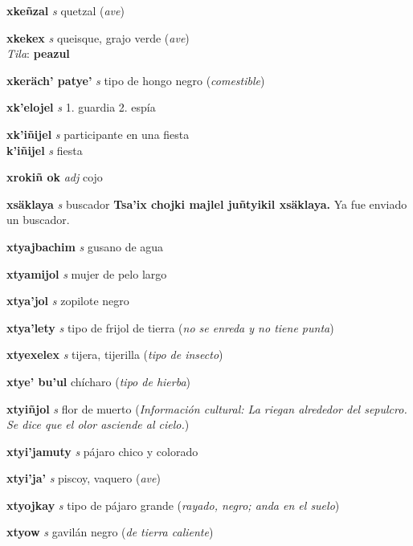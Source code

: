 \documentclass[10pt]{scrbook}
\newcommand{\entry}[1]{\textbf{#1}}
\newcommand{\onedefinition}[1]{#1.}
\newcommand{\partofspeech}[1]{\textit{#1}}
\newcommand{\spanishtranslation}[1]{#1}
\newcommand{\clarification}[1]{(\textit{#1})}
\newcommand{\cholexample}[1]{\textbf{#1}}
\newcommand{\exampletranslation}[1]{#1}
\newcommand{\dialectvariant}[1]{\\\textit{#1}:}
\newcommand{\dialectword}[1]{\textbf{#1}}
\newcommand{\culturalinformation}[1]{(\textit{#1})}
\newcommand{\secondaryentry}[1]{\\\textbf{#1}}
\newcommand{\secondpartofspeech}[1]{\textit{#1}}
\newcommand{\secondtranslation}[1]{#1}
\begin{document}
\begin{multicols}{2}
\entry{xkeñzal}
\partofspeech{s}
\spanishtranslation{quetzal}
\clarification{ave}

\entry{xkekex}
\partofspeech{s}
\spanishtranslation{queisque, grajo verde}
\clarification{ave}
\dialectvariant{Tila}
\dialectword{peazul}

\entry{xkeräch' patye'}
\partofspeech{s}
\spanishtranslation{tipo de hongo negro}
\clarification{comestible}

\entry{xk'elojel}
\partofspeech{s}
\onedefinition{1}
\spanishtranslation{guardia}
\onedefinition{2}
\spanishtranslation{espía}

\entry{xk'iñijel}
\partofspeech{s}
\spanishtranslation{participante en una fiesta}
\secondaryentry{k'iñijel}
\secondpartofspeech{s}
\secondtranslation{fiesta}

\entry{xrokiñ ok}
\partofspeech{adj}
\spanishtranslation{cojo}

\entry{xsäklaya}
\partofspeech{s}
\spanishtranslation{buscador}
\cholexample{Tsa'ix chojki majlel juñtyikil xsäklaya.}
\exampletranslation{Ya fue enviado un buscador.}

\entry{xtyajbachim}
\partofspeech{s}
\spanishtranslation{gusano de agua}

\entry{xtyamijol}
\partofspeech{s}
\spanishtranslation{mujer de pelo largo}

\entry{xtya'jol}
\partofspeech{s}
\spanishtranslation{zopilote negro}

\entry{xtya'lety}
\partofspeech{s}
\spanishtranslation{tipo de frijol de tierra}
\clarification{no se enreda y no tiene punta}

\entry{xtyexelex}
\partofspeech{s}
\spanishtranslation{tijera, tijerilla}
\clarification{tipo de insecto}

\entry{xtye' bu'ul}
\spanishtranslation{chícharo}
\clarification{tipo de hierba}

\entry{xtyiñjol}
\partofspeech{s}
\spanishtranslation{flor de muerto}
\culturalinformation{Información cultural: La riegan alrededor del sepulcro. Se dice que el olor asciende al cielo.}

\entry{xtyi'jamuty}
\partofspeech{s}
\spanishtranslation{pájaro chico y colorado}

\entry{xtyi'ja'}
\partofspeech{s}
\spanishtranslation{piscoy, vaquero}
\clarification{ave}

\entry{xtyojkay}
\partofspeech{s}
\spanishtranslation{tipo de pájaro grande}
\clarification{rayado, negro; anda en el suelo}

\entry{xtyow}
\partofspeech{s}
\spanishtranslation{gavilán negro}
\clarification{de tierra caliente}


\end{multicols}
\end{document}
